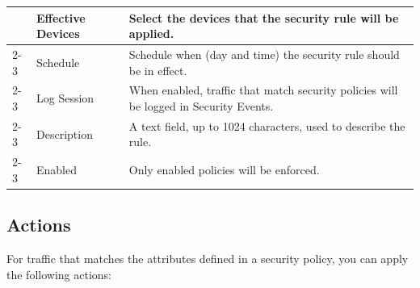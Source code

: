 \begin{longtable}{p{}|p{}|p{}}
                              & Effective Devices & Select the devices that the security rule will be applied.\\ \cline{2-3}
                              & Schedule & Schedule when (day and time) the security rule should be in effect. \\ \cline{2-3}
                              & Log Session & When enabled, traffic that match security policies will be logged in Security Events. \\ \cline{2-3}
                              & Description & A text field, up to 1024 characters, used to describe the rule. \\ \cline{2-3}
                              & Enabled & Only enabled policies will be enforced.\\ \hline                                                                                                 
\end{longtable}

\subsection*{\hypertarget{link:Security Actions}{Actions}}
\label{sec:policies:security:action}

For traffic that matches the attributes defined in a security policy, you can apply the following actions:\\


